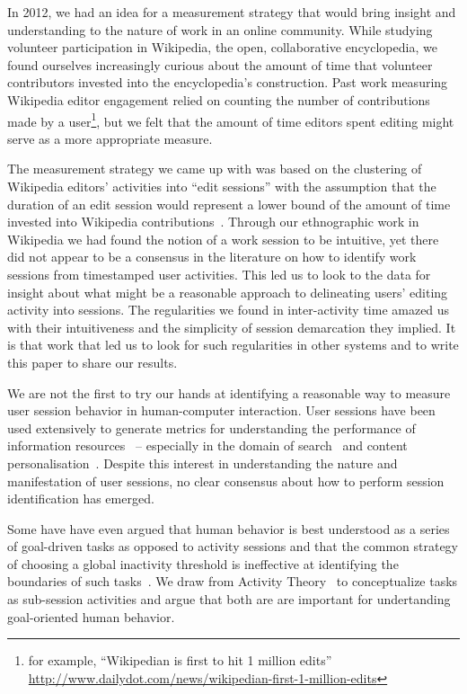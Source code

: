 In 2012, we had an idea for a measurement strategy that would bring insight and understanding to the nature of work in an online community.  While studying volunteer participation in Wikipedia, the open, collaborative encyclopedia, we found ourselves increasingly curious about the amount of time that volunteer contributors invested into the encyclopedia's construction.  Past work measuring Wikipedia editor engagement relied on counting the number of contributions made by a user\footnote{for example, ``Wikipedian is first to hit 1 million edits'' \url{http://www.dailydot.com/news/wikipedian-first-1-million-edits}}, but we felt that the amount of time editors spent editing might serve as a more appropriate measure.

The measurement strategy we came up with was based on the clustering of Wikipedia editors' activities into ``edit sessions'' with the assumption that the duration of an edit session would represent a lower bound of the amount of time invested into Wikipedia contributions~\cite{geiger2013using}.  Through our ethnographic work in Wikipedia we had found the notion of a work session to be intuitive, yet there did not appear to be a consensus in the literature on how to identify work sessions from timestamped user activities.  This led us to look to the data for insight about what might be a reasonable approach to delineating users' editing activity into sessions.  The regularities we found in inter-activity time amazed us with their intuitiveness and the simplicity of session demarcation they implied. It is that work that led us to look for such regularities in other systems and to write this paper to share our results.

We are not the first to try our hands at identifying a reasonable way to measure user session behavior in human-computer interaction.  User sessions have been used extensively to generate metrics for understanding the performance of information resources~\cite{govseva2006empirical} -- especially in the domain of search~\cite{donato2010you,eickhoff2014lessons} and content personalisation~\cite{gomory1999analysis,spiliopoulou2003framework}. Despite this interest in understanding the nature and manifestation of user sessions, no clear consensus about how to perform session identification has emerged.

Some have have even argued that human behavior is best understood as a series of goal-driven tasks as opposed to activity sessions and that the common strategy of choosing a global inactivity threshold is ineffective at identifying the boundaries of such tasks~\cite{jones2008beyond}.  We draw from Activity Theory~\cite{nardi1996context} to conceptualize tasks as sub-session activities and argue that both are are important for undertanding goal-oriented human behavior.

